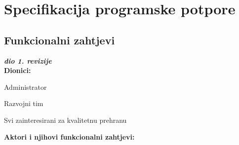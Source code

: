 \chapter{Specifikacija programske potpore}
		
	\section{Funkcionalni zahtjevi}
			
			\textbf{\textit{dio 1. revizije}}\\
			
			\noindent \textbf{Dionici:}
			
			\begin{packed_enum}
				\item Administrator
				\item Razvojni tim
				\item Svi zainteresirani za kvalitetnu prehranu
			\end{packed_enum}
			
			\noindent \textbf{Aktori i njihovi funkcionalni zahtjevi:}
			
